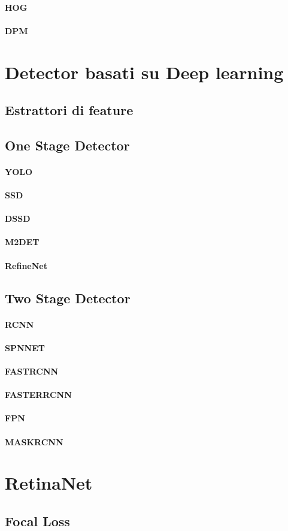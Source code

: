 \paragraph{HOG}
\paragraph{DPM}
\section{Detector basati su Deep learning}
\label{sec:deep_learning_obj}
\subsection{Estrattori di feature}
\label{sec:feature_extractor}
\subsection{One Stage Detector}
\label{subsec:one_stage_detector}
\paragraph{YOLO}
\paragraph{SSD}
\paragraph{DSSD}
\paragraph{M2DET}
\paragraph{RefineNet}
\subsection{Two Stage Detector}
\label{subsec:two_stage_detector}
\paragraph{RCNN}
\paragraph{SPNNET}
\paragraph{FASTRCNN}
\paragraph{FASTERRCNN}
\paragraph{FPN}
\paragraph{MASKRCNN}
\section{RetinaNet}
\subsection{Focal Loss}